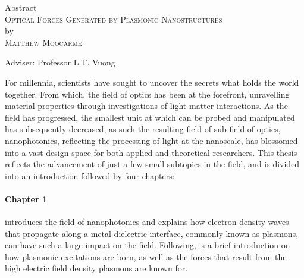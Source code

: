 \begin{center}

Abstract \\
\textsc{Optical Forces Generated by Plasmonic Nanostructures} \\
by \\
\textsc{Matthew Moocarme} \\[0.25in]
\end{center}

\vspace{0.25in}

\noindent Adviser: Professor L.T. Vuong

\vspace{0.25in}

\noindent 
For millennia, scientists have sought to uncover the secrets what holds the world together. From which, the field of optics has been at the forefront, unravelling material properties through investigations of light-matter interactions. 
As the field has progressed, the smallest unit at which can be probed and manipulated has subsequently decreased, as such the resulting field of sub-field of optics, nanophotonics, reflecting the processing of light at the nanoscale, has blossomed into a vast design space for both applied and theoretical researchers.
This thesis reflects the advancement of just a few small subtopics in the field, and is divided into an introduction followed by four chapters:

\paragraph{Chapter 1} introduces the field of nanophotonics and explains how electron density waves that propagate along a metal-dielectric interface, commonly known as plasmons, can have such a large impact on the field. Following, is a brief introduction on how plasmonic excitations are born, as well as the forces that result from the high electric field density plasmons are known for.

